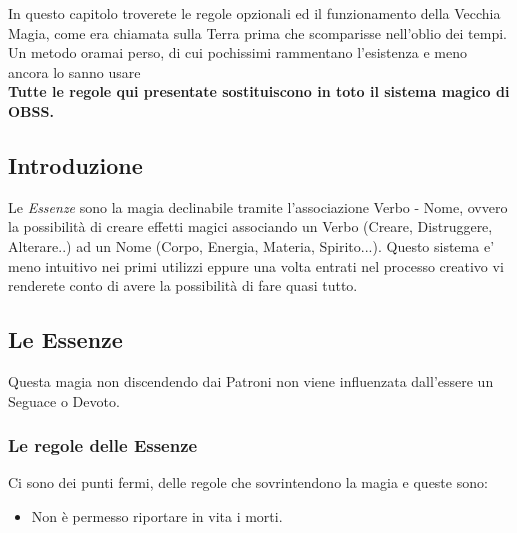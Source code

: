 \documentclass[a4paper,twoside,openany]{book}
\begin{document}
\begin{multicols}{2}

\begin{changemargin}{0.3cm}{0.3cm}\begin{narratore}

In questo capitolo troverete le regole opzionali ed il funzionamento della Vecchia Magia, come era chiamata sulla Terra prima che scomparisse nell'oblio dei tempi. Un metodo oramai perso, di cui pochissimi rammentano l'esistenza e meno ancora lo sanno usare\\

\textbf{Tutte le regole qui presentate sostituiscono in toto il sistema magico di OBSS.}

\end{narratore}\end{changemargin}

\subsection{Introduzione}

Le \textit{Essenze} sono la magia declinabile tramite l'associazione Verbo - Nome, ovvero la possibilità di creare effetti magici associando un Verbo (Creare, Distruggere, Alterare..) ad un Nome (Corpo, Energia, Materia, Spirito...). Questo sistema e' meno intuitivo nei primi utilizzi eppure una volta entrati nel processo creativo vi renderete conto di avere la possibilità di fare quasi tutto.

\subsection{Le Essenze}

Questa magia non discendendo dai Patroni non viene influenzata dall'essere un Seguace o Devoto.

\subsubsection{Le regole delle Essenze}

\label{le-regole-delle-essenze}

Ci sono dei punti fermi, delle regole che sovrintendono la magia e queste sono:

\begin{itemize}[leftmargin=*] \setlength{\itemsep}{0pt}
\item Non è permesso riportare in vita i morti.


\end{itemize}
\end{multicols}
\end{document}

